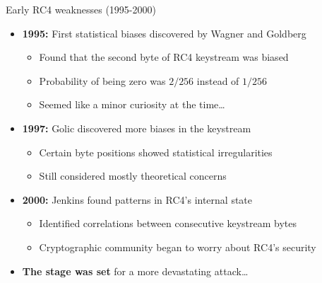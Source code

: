 \documentclass[aspectratio=169, lualatex, handout]{beamer}
\begin{document}
\begin{frame}{Early RC4 weaknesses (1995-2000)}
	\begin{itemize}[<+->]
		\item \textbf{1995:} First statistical biases discovered by Wagner and Goldberg
		      \begin{itemize}[<+->]
			      \item Found that the second byte of RC4 keystream was biased
			      \item Probability of being zero was $2/256$ instead of $1/256$
			      \item Seemed like a minor curiosity at the time\ldots
		      \end{itemize}
		\item \textbf{1997:} Golic discovered more biases in the keystream
		      \begin{itemize}[<+->]
			      \item Certain byte positions showed statistical irregularities
			      \item Still considered mostly theoretical concerns
		      \end{itemize}
		\item \textbf{2000:} Jenkins found patterns in RC4's internal state
		      \begin{itemize}[<+->]
			      \item Identified correlations between consecutive keystream bytes
			      \item Cryptographic community began to worry about RC4's security
		      \end{itemize}
		\item \textbf{The stage was set} for a more devastating attack\ldots
	\end{itemize}
\end{frame}
\end{document}
